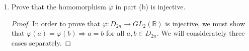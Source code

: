\documentclass{article}
\begin{document}
\begin{enumerate}[label=(\alph*)]
\begin{proof}
            We can find the inverse of a $2 \times 2$ matrix $\begin{pmatrix}a & b \\ c & d\end{pmatrix}$ by the formula \newline $\dfrac{1}{ad - bc}\begin{pmatrix}d & -b \\ -c & a\end{pmatrix}$. The inverse $\varphi(r)^{-1}$, then, is: \newline $\dfrac{1}{\sin^2{\theta} + \cos^2{\theta}}\begin{pmatrix}\cos \theta & \sin \theta \\ -\sin \theta & \cos \theta\end{pmatrix} = \begin{pmatrix}\cos \theta & \sin \theta \\ -\sin \theta & \cos \theta\end{pmatrix}$.
            Then:
            \begin{multline*}
                \varphi(s)\varphi(r) = \begin{pmatrix}0 & 1 \\ 1 & 0\end{pmatrix}\begin{pmatrix}\cos \theta & -\sin \theta \\ \sin \theta & \cos \theta\end{pmatrix} = \begin{pmatrix}\sin \theta & \cos \theta \\ \cos \theta & -\sin \theta\end{pmatrix} = \\
                \begin{pmatrix}\cos \theta & \sin \theta \\ -\sin \theta & \cos \theta\end{pmatrix}\begin{pmatrix}0 & 1 \\ 1 & 0\end{pmatrix} = \varphi(r)^{-1} \varphi(s),
            \end{multline*}
            as desired. Since the generators and relations of $D_{2n}$ hold under $\varphi$ into $GL_2(\mathbb{R})$, $\varphi$ is a homomorphism of $D_{2n}$ into $GL_2(\mathbb{R})$.
          \end{proof}
    \item Prove that the homomorphism $\varphi$ in part (b) is injective.
          \begin{proof}
            In order to prove that $\varphi: D_{2n} \rightarrow GL_2(\mathbb{R})$ is injective, we must show that $\varphi(a) = \varphi(b) \Rightarrow a = b$ for all $a, b \in D_{2n}$. We will considerately three cases separately.


\end{proof}
\end{enumerate}
\end{document}
